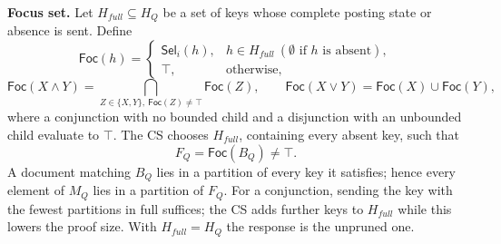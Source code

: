 
\textbf{Focus set.} Let $H_{full} \subseteq H_Q$ be a set of keys whose complete posting state or
absence is sent. Define
\begin{equation}
\mathsf{Foc}(h) =
\begin{cases}
\mathsf{Sel}_i(h), & h \in H_{full} \ (\emptyset \text{ if } h \text{ is absent}),\\
\top, & \text{otherwise},
\end{cases}
\end{equation}
\begin{equation}
\mathsf{Foc}(X \wedge Y) = \bigcap_{Z \in \{X,Y\},\ \mathsf{Foc}(Z) \ne \top} \mathsf{Foc}(Z), \qquad
\mathsf{Foc}(X \vee Y) = \mathsf{Foc}(X) \cup \mathsf{Foc}(Y),
\end{equation}
where a conjunction with no bounded child and a disjunction with an unbounded child evaluate to $\top$.
The CS chooses $H_{full}$, containing every absent key, such that
\begin{equation}
F_Q = \mathsf{Foc}(B_Q) \ne \top .
\end{equation}
A document matching $B_Q$ lies in a partition of every key it satisfies; hence every element of $M_Q$
lies in a partition of $F_Q$. For a conjunction, sending the key with the fewest partitions in full
suffices; the CS adds further keys to $H_{full}$ while this lowers the proof size. With
$H_{full} = H_Q$ the response is the unpruned one.

